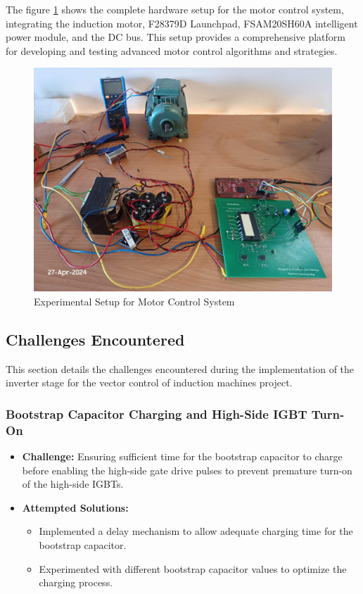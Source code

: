 
The figure \ref{fig:Complete Hardware Setup} shows the complete hardware setup for the motor control system, integrating the induction motor, F28379D Launchpad, FSAM20SH60A intelligent power module, and the DC bus. This setup provides a comprehensive platform for developing and testing advanced motor control algorithms and strategies.

\begin{figure}
	\centering
	\includegraphics[width=5in]{sections/section6/images/hardwareSetup/fullSetupWithMotorAndIPM.jpg}
	\caption{Experimental Setup for Motor Control System}
	\label{fig:Complete Hardware Setup}
\end{figure}

\newpage
\subsection{Challenges Encountered}

This section details the challenges encountered during the implementation of the inverter stage for the vector control of induction machines project.

\subsubsection{Bootstrap Capacitor Charging and High-Side IGBT Turn-On}

\begin{itemize}
	\item \textbf{Challenge:} Ensuring sufficient time for the bootstrap capacitor to charge before enabling the high-side gate drive pulses to prevent premature turn-on of the high-side IGBTs.
	\item \textbf{Attempted Solutions:}
	      \begin{itemize}
		      \item Implemented a delay mechanism to allow adequate charging time for the bootstrap capacitor.
		      \item Experimented with different bootstrap capacitor values to optimize the charging process.
	      \end{itemize}
\end{itemize}


